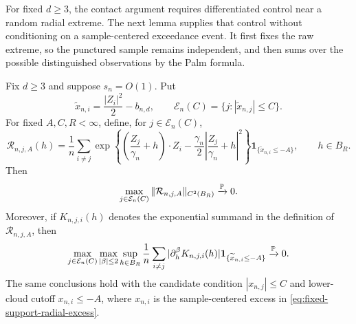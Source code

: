 For fixed \(d\ge3\), the contact argument requires differentiated control near
a random radial extreme.  The next lemma supplies that control without
conditioning on a sample-centered exceedance event.  It first fixes the raw
extreme, so the punctured sample remains independent, and then sums over the
possible distinguished observations by the Palm formula.
\begin{lemma}
\label{lem:support-dge3-palm-c2}
Fix \(d\ge3\) and suppose \(s_n=O(1)\).  Put
\[
 \widetilde x_{n,i}=\frac{|Z_i|^2}{2}-b_{n,d},
 \qquad
 \mathcal E_n(C)=\{j:|\widetilde x_{n,j}|\le C\}.
\]
For fixed \(A,C,R<\infty\), define, for \(j\in\mathcal E_n(C)\),
\[
 \mathcal R_{n,j,A}(h)
 =\frac1n\sum_{i\ne j}
   \exp\left\{
      \left(\frac{Z_j}{\gamma_n}+h\right)\!\cdot Z_i
      -\frac{\gamma_n}{2}
       \left|\frac{Z_j}{\gamma_n}+h\right|^2
   \right\}
   \mathbf 1_{\{\widetilde x_{n,i}\le-A\}},
 \qquad h\in B_R.
\]
Then
\begin{equation}
\label{eq:support-dge3-palm-c2}
 \max_{j\in\mathcal E_n(C)}
 \|\mathcal R_{n,j,A}\|_{C^2(B_R)}\xrightarrow{\mathbb P}0.
\end{equation}
Moreover, if \(K_{n,j,i}(h)\) denotes the exponential summand in the
definition of \(\mathcal R_{n,j,A}\), then
\begin{equation}
\label{eq:support-dge3-palm-absolute}
 \max_{j\in\mathcal E_n(C)}\max_{|\beta|\le2}\sup_{h\in B_R}
 \frac1n\sum_{i\ne j}
 |\partial_h^\beta K_{n,j,i}(h)|
 \mathbf1_{\{\widetilde x_{n,i}\le-A\}}
 \xrightarrow{\mathbb P}0.
\end{equation}
The same conclusions hold with the candidate condition
\(|x_{n,j}|\le C\) and lower-cloud cutoff \(x_{n,i}\le-A\), where \(x_{n,i}\)
is the sample-centered excess in \eqref{eq:fixed-support-radial-excess}.
\end{lemma}

